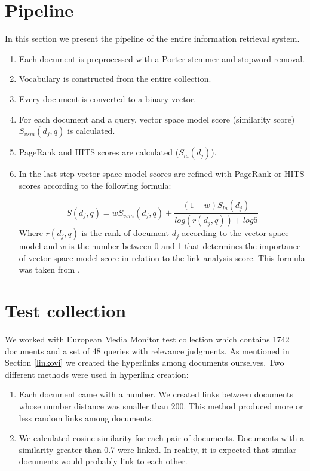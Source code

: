 \documentclass[10pt, a4paper]{article}
\begin{document}
\section{Pipeline}
In this section we present the pipeline of the entire information retrieval system.

\begin{enumerate}
\item Each document is preprocessed with a Porter stemmer and stopword removal.
\item Vocabulary is constructed from the entire collection.
\item Every document is converted to a binary vector.
\item For each document and a query, vector space model score (similarity score) $S_{vsm}(d_j, q)$ is calculated.
\item PageRank and HITS scores are calculated ($S_{la}(d_j)$).
\item In the last step vector space model scores are refined with PageRank or HITS scores according to the following formula:

\begin{equation}
  S(d_j, q) = wS_{vsm}(d_j, q) + \frac{(1-w)S_{la}(d_j)}{log(r(d_j, q)) + log5}
\end{equation}
Where  $r(d_j, q)$ is the rank of document $d_j$ according to the vector space model and $w$ is the number between 0 and 1 that determines the importance of vector space model score in relation to the link analysis score. This formula was taken from \citep{kinez}.

\end{enumerate}
\section{Test collection} \label{testCollection}
We worked with European Media Monitor test collection which contains 1742 documents and a set of 48 queries with relevance judgments. As mentioned in Section \ref{linkovi} we created the hyperlinks among documents ourselves. Two different methods were used in hyperlink creation:
\begin{enumerate}
\item Each document came with a number. We created links between documents whose number distance was smaller than 200. This method produced more or less random links among documents.
\item We calculated cosine similarity for each pair of documents. Documents with a similarity greater than 0.7 were linked. In reality, it is expected that similar documents would probably link to each other.
\end{enumerate}
\end{document}
